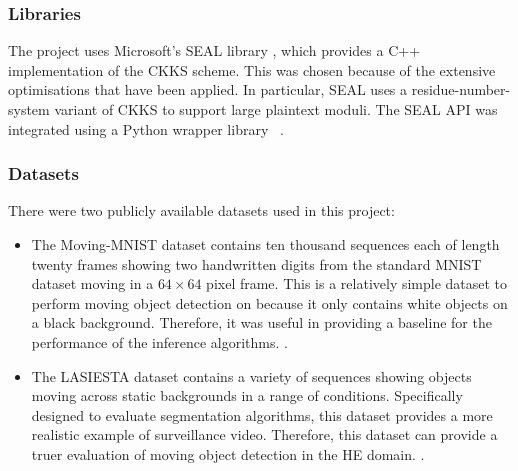 \setlength{\leftskip}{0cm}
\subsubsection{Libraries}
\setlength{\leftskip}{0.5cm}
\indent \indent
The project uses Microsoft's SEAL library \cite{SEAL}, which provides a C++ implementation of the CKKS scheme. This was chosen because of the extensive optimisations that have been applied. In particular, SEAL uses a residue-number-system variant of CKKS to support large plaintext moduli. The SEAL API was integrated using a Python wrapper library ~\cite{Wrapper}.

\setlength{\leftskip}{0cm}
\subsubsection{Datasets}
\setlength{\leftskip}{0.5cm}
\indent \indent
There were two publicly available datasets used in this project:
\begin{itemize}[leftmargin=1.5cm]
    \item The Moving-MNIST dataset contains ten thousand sequences each of length twenty frames showing two handwritten digits from the standard MNIST dataset moving in a $64 \times 64$ pixel frame. This is a relatively simple dataset to perform moving object detection on because it only contains white objects on a black background. Therefore, it was useful in providing a baseline for the performance of the inference algorithms. \cite{MovingMNIST, MNIST}.
    \item The LASIESTA dataset contains a variety of sequences showing objects moving across static backgrounds in a range of conditions. Specifically designed to evaluate segmentation algorithms, this dataset provides a more realistic example of surveillance video. Therefore, this dataset can provide a truer evaluation of moving object detection in the HE domain. \cite{LASIESTA}.
\end{itemize}

\setlength{\leftskip}{0cm}
